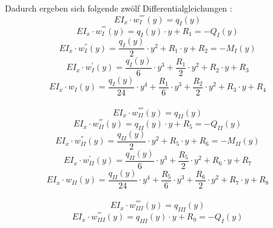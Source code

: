 \noindent Dadurch ergeben sich folgende zwölf Differentialgleichungen \cite{item16}:
\begin{equation} \label{eq:7}
	EI_{x}\cdot w_{I}^{''''}(y) = q_{I}(y)
\end{equation}
\begin{equation}\label{eq:8}
	EI_{x}\cdot w_{I}^{'''}(y) = q_{I}(y)\cdot y + R_{1} = -Q_{I}(y)
\end{equation}
\begin{equation}\label{eq:9}
	EI_{x}\cdot w_{I}^{''}(y) = \frac{q_{I}(y)}{2}\cdot y^{2} + R_{1}\cdot y + R_{2} = -M_{I}(y)
\end{equation}
\begin{equation}\label{eq:10}
	EI_{x}\cdot w_{I}^{'}(y) = \frac{q_{I}(y)}{6}\cdot y^{3} + \frac{R_{1}}{2}\cdot y^{2} + R_{2}\cdot y + R_{3} 
\end{equation}
\begin{equation}\label{eq:11}
	EI_{x}\cdot w_{I}(y) = \frac{q_{I}(y)}{24}\cdot y^{4} + \frac{R_{1}}{6}\cdot y^{3} + \frac{R_{2}}{2}\cdot y^{2} + R_{3}\cdot y + R_{4}
\end{equation}\\
\begin{equation}\label{eq:12}
	EI_{x}\cdot w_{II}^{''''}(y) = q_{II}(y)
\end{equation}
\begin{equation}\label{eq:13}
	EI_{x}\cdot w_{II}^{'''}(y) = q_{II}(y)\cdot y + R_{5} = -Q_{II}(y)
\end{equation}
\begin{equation}\label{eq:14}
	EI_{x}\cdot w_{II}^{''}(y) = \frac{q_{II}(y)}{2}\cdot y^{2} + R_{5}\cdot y + R_{6} = -M_{II}(y)
\end{equation}
\begin{equation}\label{eq:15}
	EI_{x}\cdot w_{II}^{'}(y) = \frac{q_{II}(y)}{6}\cdot y^{3} + \frac{R_{5}}{2}\cdot y^{2} + R_{6}\cdot y + R_{7} 
\end{equation}
\begin{equation}\label{eq:16}
	EI_{x}\cdot w_{II}(y) = \frac{q_{II}(y)}{24}\cdot y^{4} + \frac{R_{5}}{6}\cdot y^{3} + \frac{R_{6}}{2}\cdot y^{2} + R_{7}\cdot y + R_{8}
\end{equation}\\
\begin{equation}\label{eq:17}
	EI_{x}\cdot w_{III}^{''''}(y) = q_{III}(y)
\end{equation}
\begin{equation}\label{eq:18}
	EI_{x}\cdot w_{III}^{'''}(y) = q_{III}(y)\cdot y + R_{9} = -Q_{I}(y)
\end{equation}

